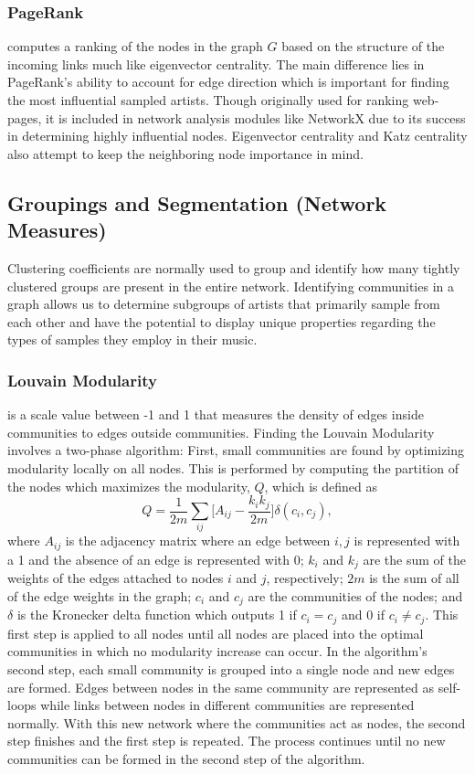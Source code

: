 \documentclass[pageno]{jpaper}
\begin{document}
\subsubsection{PageRank}
computes a ranking of the nodes in the graph $G$ based on the structure of the incoming links much like eigenvector centrality. The main difference lies in PageRank's ability to account for edge direction which is important for finding the most influential sampled artists. Though originally used for ranking web-pages, it is included in network analysis modules like NetworkX due to its success in determining highly influential nodes. Eigenvector centrality and Katz centrality also attempt to keep the neighboring node importance in mind.
\subsection{Groupings and Segmentation (Network Measures)}
Clustering coefficients are normally used to group and identify how many tightly clustered groups are present in the entire network. Identifying communities in a graph allows us to determine subgroups of artists that primarily sample from each other and have the potential to display unique properties regarding the types of samples they employ in their music.
\subsubsection{Louvain Modularity}
is a scale value between -1 and 1 that measures the density of edges inside communities to edges outside communities. Finding the Louvain Modularity involves a two-phase algorithm: First, small communities are found by optimizing modularity locally on all nodes. This is performed by computing the partition of the nodes which maximizes the modularity, $Q$, which is defined as
\begin{equation}
Q={\frac {1}{2m}}\sum \limits _{ij}{\bigg [}A_{ij}-{\frac {k_{i}k_{j}}{2m}}{\bigg ]}\delta (c_{i},c_{j}),
\end{equation} where $A_{ij}$ is the adjacency matrix where an edge between $i, j$ is represented with a 1 and the absence of an edge is represented with 0;
$k_{i}$ and $k_{j}$ are the sum of the weights of the edges attached to nodes $i$ and $j$, respectively;
$2m$ is the sum of all of the edge weights in the graph; 
$c_{i}$ and $c_{j}$ are the communities of the nodes;
and $\delta$ is the Kronecker delta function which outputs 1 if $c_i=c_j$ and 0 if $c_i\neq c_j$. This first step is applied to all nodes until all nodes are placed into the optimal communities in which no modularity increase can occur. In the algorithm's second step, each small community is grouped into a single node and new edges are formed. Edges between nodes in the same community are represented as self-loops while links between nodes in different communities are represented normally. With this new network where the communities act as nodes, the second step finishes and the first step is repeated. The process continues until no new communities can be formed in the second step of the algorithm.
\end{document}
